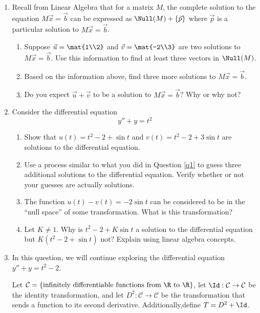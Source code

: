 \begin{enumerate}
	\item\label{q1}
	Recall from Linear Algebra that for a matrix $M$, the complete solution to the equation $M\vec x=\vec b$ can be expressed as
	$
		\Null(M)+\{\vec p\}
	$
		where $\vec p$ is a particular solution to $M\vec x=\vec b$.
		
	\begin{enumerate}
		\item Suppose $\vec u=\mat{1\\2}$ and $\vec v=\mat{-2\\3}$ are two solutions to $M\vec x=\vec b$. Use this information
		to find at least three vectors in $\Null(M)$.
		\item Based on the information above, find three more solutions to $M\vec x=\vec b$.
		\item Do you expect $\vec u+\vec v$ to be a solution to $M\vec x=\vec b$? Why or why not?
	\end{enumerate}

	\item Consider the differential equation
	\[
		y''+y=t^2
	\]
	\begin{enumerate}
		\item Show that $u(t)=t^2-2+\sin t$ and $v(t)=t^2-2+3\sin t$ are solutions to the differential equation.
		\item Use a process similar to what you did in Question \ref{q1} to guess three additional solutions to the differential equation. Verify
		whether or not your guesses are actually solutions.
		\item The function $u(t)-v(t)=-2\sin t$ can be considered to be in the ``null space'' of some transformation. What is this transformation?
		\item Let $K\neq 1$. Why is $t^2-2+K\sin t$ a solution to the differential equation but $K(t^2-2+\sin t)$ not? Explain using linear algebra concepts.
	\end{enumerate}

	\item In this question, we will continue exploring the differential equation $y''+y=t^2-2$.
	
	Let $\mathcal C=\{\text{infinitely differentiable functions from $\R$ to $\R$}\}$, let $\Id:\mathcal C\to\mathcal C$
	be the identity transformation, and let $D^2:\mathcal C\to\mathcal C$ be the transformation that sends a function to its second derivative.
	Additionally,define $T=D^2+\Id$.


\end{enumerate}

